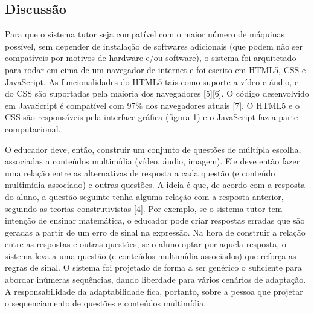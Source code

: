 \documentclass{article}
\begin{document}
\subsection{Discussão}

Para que o sistema tutor seja compatível com o maior número de máquinas possível, sem depender de instalação de softwares adicionais (que podem não ser compatíveis por motivos de hardware e/ou software), o sistema foi arquitetado para rodar em cima de um navegador de internet e foi escrito em HTML5, CSS e JavaScript. As funcionalidades do HTML5 tais como suporte a vídeo e áudio, e do CSS são suportadas pela maioria dos navegadores [5][6]. O código desenvolvido em JavaScript é compatível com 97\% dos navegadores atuais [7]. O HTML5 e o CSS são responsáveis pela interface gráfica (figura 1) e o JavaScript faz a parte computacional.

O educador deve, então, construir um conjunto de questões de múltipla escolha, associadas a conteúdos multimídia (vídeo, áudio, imagem). Ele deve então fazer uma relação entre as alternativas de resposta a cada questão (e conteúdo multimídia associado) e outras questões. A ideia é que, de acordo com a resposta do aluno, a questão seguinte tenha alguma relação com a resposta anterior, seguindo as teorias construtivistas [4]. Por exemplo, se o sistema tutor tem intenção de ensinar matemática, o educador pode criar respostas erradas que são geradas a partir de um erro de sinal na expressão. Na hora de construir a relação entre as respostas e outras questões, se o aluno optar por aquela resposta, o sistema leva a uma questão (e conteúdos multimídia associados) que reforça as regras de sinal. O sistema foi projetado de forma a ser genérico o suficiente para abordar inúmeras sequências, dando liberdade para vários cenários de adaptação. A responsabilidade da adaptabilidade fica, portanto, sobre a pessoa que projetar o sequenciamento de questões e conteúdos multimídia. 
\end{document}
